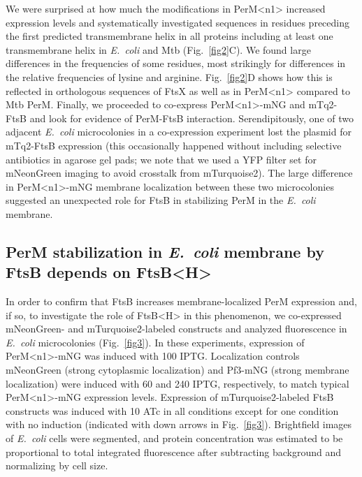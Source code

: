 \documentclass[twocolumn,pdflatex,sn-nature]{sn-jnl}%
\def\textsuperscript#1{<#1>}%
\newcommand\ec{\textit{E.~coli}}
\newcommand\mtb{Mtb}
\newcommand\ftsbH{FtsB\textsuperscript{H}}
\newcommand\permN{PerM\textsuperscript{n1}}
\begin{document}
We were surprised at how much the modifications in \permN{} increased expression levels and systematically investigated sequences in residues preceding the first predicted transmembrane helix in all proteins including at least one transmembrane helix in \ec{} and \mtb{} (Fig.~\ref{fig2}C).
We found large differences in the frequencies of some residues, most strikingly for differences in the relative frequencies of lysine and arginine. Fig.~\ref{fig2}D shows how this is reflected in orthologous sequences of FtsX as well as in \permN{} compared to \mtb{} PerM.
Finally, we proceeded to co-express \permN{}-mNG and mTq2-FtsB and look for evidence of PerM-FtsB interaction.
Serendipitously, one of two adjacent \ec{} microcolonies in a co-expression experiment lost the plasmid for mTq2-FtsB expression (this occasionally happened without including selective antibiotics in agarose gel pads; we note that we used a YFP filter set for mNeonGreen imaging to avoid crosstalk from mTurquoise2).
The large difference in \permN{}-mNG membrane localization between these two microcolonies suggested an unexpected role for FtsB in stabilizing PerM in the \ec{} membrane.

\subsection{PerM stabilization in \ec{} membrane by FtsB depends on \ftsbH{}}

In order to confirm that FtsB increases membrane-localized PerM expression and, if so, to investigate the role of \ftsbH{} in this phenomenon, we co-expressed mNeonGreen- and mTurquoise2-labeled constructs and analyzed fluorescence in \ec{} microcolonies (Fig.~\ref{fig3}).
In these experiments, expression of \permN{}-mNG was induced with \qty{100}{\uM} IPTG. Localization controls mNeonGreen (strong cytoplasmic localization) and Pf3-mNG (strong membrane localization) were induced with \qty{60}{\uM} and \qty{240}{\uM} IPTG, respectively, to match typical \permN{}-mNG expression levels.
Expression of mTurquoise2-labeled FtsB constructs was induced with \qty{10}{\nM} ATc in all conditions except for one condition with no induction (indicated with down arrows in Fig.~\ref{fig3}).
Brightfield images of \ec{} cells were segmented, and protein concentration was estimated to be proportional to total integrated fluorescence after subtracting background and normalizing by cell size.
\end{document}
